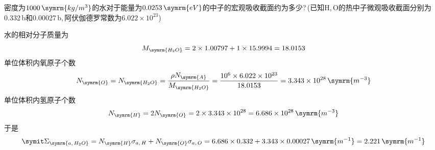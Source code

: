 \begin{exercise}
    密度为$1000\,\symrm{kg/m^3}$的水对于能量为$0.0253\,\symrm{eV}$的中子的宏观吸收截面约为多少?\,(已知H,\,O的热中子微观吸收截面分别为0.332\,b和0.00027\,b,\,阿伏伽德罗常数为$6.022 \times 10^{23}$)
    \begin{solution}
        水的相对分子质量为
        \begin{equation*}
            M_{\symrm{H_2O}} = 2 \times 1.00797 + 1 \times 15.9994 = 18.0153
        \end{equation*}
        单位体积内氧原子个数
        \begin{equation*}
            N_{\symrm{O}} = N_{\symrm{H_2O}} = \frac{\rho N_{\symrm{A}}}{M_{\symrm{H_2O}}} = \frac{10^6 \times 6.022 \times 10^{23}}{18.0153} = 3.343 \times 10^{28} \, \symrm{m^{-3}}
        \end{equation*}
        单位体积内氢原子个数
        \begin{equation*}
            N_{\symrm{H}} = 2 N_{\symrm{O}} = 2 \times 3.343 \times 10^{28} = 6.686 \times 10^{28} \, \symrm{m^{-3}}
        \end{equation*}
        于是
        \begin{equation*}
            \vSigma_{\symrm{a,\,H_2O}} = N_{\symrm{H}}\sigma_{a,\,H} + N_{\symrm{O}}\sigma_{a,\,O} = 6.686 \times 0.332 + 3.343 \times 0.00027 \, \symrm{m^{-1}} = 2.221\,\symrm{m^{-1}}
        \end{equation*}
    \end{solution}
\end{exercise}

